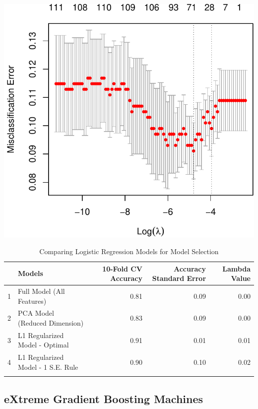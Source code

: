 \documentclass[11pt,preprint, authoryear]{elsarticle}
\let\origfigure\figure
\let\endorigfigure\endfigure
\renewenvironment{figure}[1][2] {
    \expandafter\origfigure\expandafter[H]
} {
    \endorigfigure
}
\numberwithin{equation}{section}
\numberwithin{figure}{section}
\numberwithin{table}{section}
\begin{document}
\begin{figure}[H]

{\centering \includegraphics{DS-Report-20065124_files/figure-latex/unnamed-chunk-13-1} 

}

\caption{Misclassification Error of Penalised Logistic Regression for Different Penalties \label{FigureLogistic}}\label{fig:unnamed-chunk-13}
\end{figure}

\begin{longtable}{rlrrr}
  \hline
 & Models & 10-Fold CV Accuracy & Accuracy Standard Error & Lambda Value \\ 
  \hline
1 & Full Model (All Features) & 0.81 & 0.09 & 0.00 \\ 
  2 & PCA Model (Reduced Dimension) & 0.83 & 0.09 & 0.00 \\ 
  3 & L1 Regularized Model - Optimal & 0.91 & 0.01 & 0.01 \\ 
  4 & L1 Regularized Model - 1 S.E. Rule & 0.90 & 0.10 & 0.02 \\ 
   \hline
\hline
\caption{Comparing Logistic Regression Models for Model Selection \label{LogisticTable}} 
\end{longtable}

\hypertarget{extreme-gradient-boosting-machines}{%
\subsection{eXtreme Gradient Boosting
Machines}\label{extreme-gradient-boosting-machines}}
\end{document}
